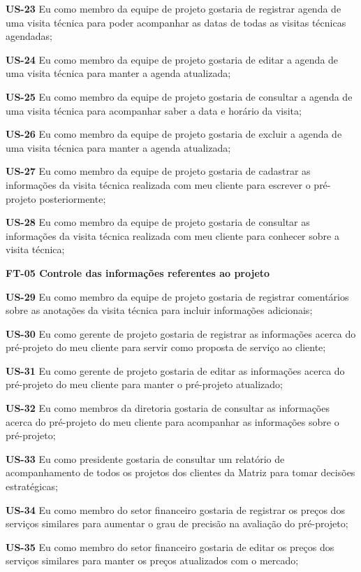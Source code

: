 \textbf{US-23} Eu como membro da equipe de projeto gostaria de registrar agenda de uma visita técnica para poder acompanhar as datas de todas as visitas técnicas agendadas;


\textbf{US-24} Eu como membro da equipe de projeto gostaria de editar a agenda de uma visita técnica para manter a agenda atualizada;


\textbf{US-25} Eu como membro da equipe de projeto gostaria de consultar a agenda de uma visita técnica para acompanhar saber a data e horário da visita;


\textbf{US-26} Eu como membro da equipe de projeto gostaria de excluir a agenda de uma visita técnica para manter a agenda atualizada;


\textbf{US-27} Eu como membro da equipe de projeto gostaria de cadastrar as informações da visita técnica realizada com meu cliente para escrever o pré-projeto posteriormente;


\textbf{US-28} Eu como membro da equipe de projeto gostaria de consultar as informações da visita técnica realizada com meu cliente para conhecer sobre a visita técnica;


\textbf{FT-05 Controle das informações referentes ao projeto}

\textbf{US-29} Eu como membro da equipe de projeto gostaria de registrar comentários sobre as anotações da visita técnica para incluir informações adicionais;


\textbf{US-30} Eu como gerente de projeto gostaria de registrar as informações acerca do pré-projeto do meu cliente para servir como proposta de serviço ao cliente;


\textbf{US-31} Eu como gerente de projeto gostaria de editar as informações acerca do pré-projeto do meu cliente para manter o pré-projeto atualizado;


\textbf{US-32} Eu como membros da diretoria gostaria de consultar as informações acerca do pré-projeto do meu cliente para acompanhar as informações sobre o pré-projeto;


\textbf{US-33} Eu como presidente gostaria de consultar um relatório de acompanhamento de todos os projetos dos clientes da Matriz para tomar decisões estratégicas;


\textbf{US-34} Eu como membro do setor financeiro gostaria de registrar os preços dos serviços similares para aumentar o grau de precisão na avaliação do pré-projeto;


\textbf{US-35} Eu como membro do setor financeiro gostaria de editar os preços dos serviços similares para manter os preços atualizados com o mercado;


